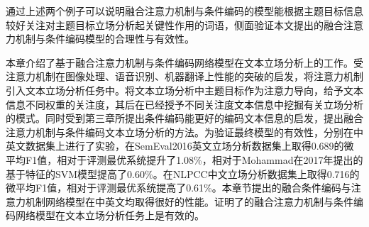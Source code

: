 通过上述两个例子可以说明融合注意力机制与条件编码的模型能根据主题目标信息较好关注对主题目标立场分析起关键性作用的词语，侧面验证本文提出的融合注意力机制与条件编码模型的合理性与有效性。



本章介绍了基于融合注意力机制与条件编码网络模型在文本立场分析上的工作。受注意力机制在图像处理、语音识别、机器翻译上性能的突破的启发，将注意力机制引入文本立场分析任务中。将文本立场分析中主题目标作为注意力导向，给予文本信息不同权重的关注度，其后在已经授予不同关注度文本信息中挖掘有关立场分析的模式。同时受到第三章所提出条件编码能更好的编码文本信息的启发，提出融合注意力机制与条件编码文本立场分析的方法。为验证最终模型的有效性，分别在中英文数据集上进行了实验，在SemEval2016英文立场分析数据集上取得0.689的微平均F1值，相对于评测最优系统提升了1.08\%，相对于Mohammad在2017年提出的基于特征的SVM模型提高了0.60\%。在NLPCC中文立场分析数据集上取得0.716的微平均F1值，相对于评测最优系统提高了0.61\%。本章节提出的融合条件编码与注意力机制网络模型在中英文均取得很好的性能。证明了的融合注意力机制与条件编码网络模型在文本立场分析任务上是有效的。




